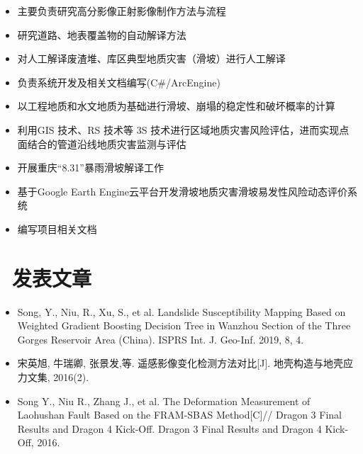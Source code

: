 \documentclass{resume}
\begin{document}
\begin{itemize}
  \item 主要负责研究高分影像正射影像制作方法与流程
  \item 研究道路、地表覆盖物的自动解译方法
  \item 对人工解译废渣堆、库区典型地质灾害（滑坡）进行人工解译
\end{itemize}

\begin{itemize}
  \item 负责系统开发及相关文档编写(C\#/ArcEngine)
  \item 以工程地质和水文地质为基础进行滑坡、崩塌的稳定性和破坏概率的计算
  \item 利用GIS 技术、RS 技术等 3S 技术进行区域地质灾害风险评估，进而实现点面结合的管道沿线地质灾害监测与评估
\end{itemize}

\begin{itemize}
  \item 开展重庆“8.31”暴雨滑坡解译工作
  \item 基于Google Earth Engine云平台开发滑坡地质灾害滑坡易发性风险动态评价系统
  \item 编写项目相关文档
\end{itemize}


\section{\faUsers\ 发表文章}
\begin{itemize}

\item  Song, Y., Niu, R., Xu, S., et al. Landslide Susceptibility Mapping Based on Weighted Gradient Boosting Decision Tree in Wanzhou Section of the Three Gorges Reservoir Area (China). ISPRS Int. J. Geo-Inf. 2019, 8, 4.
\item 宋英旭, 牛瑞卿, 张景发,等. 遥感影像变化检测方法对比[J]. 地壳构造与地壳应力文集, 2016(2).
\item Song Y., Niu R., Zhang J., et al. The Deformation Measurement of Laohushan Fault Based on the FRAM-SBAS Method[C]// Dragon 3 Final Results and Dragon 4 Kick-Off. Dragon 3 Final Results and Dragon 4 Kick-Off, 2016.
\end{itemize}
\end{document}
